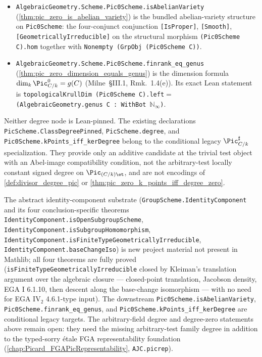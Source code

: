 \begin{itemize}
    \cref{thm:pic_is_group_scheme}.
  \item \texttt{AlgebraicGeometry.Scheme.Pic0Scheme.isAbelianVariety}
    (\cref{thm:pic_zero_is_abelian_variety}) is the bundled
    abelian-variety structure on \texttt{Pic0Scheme}: the four-conjunct
    conjunction \texttt{[IsProper]}, \texttt{[Smooth]},
    \texttt{[GeometricallyIrreducible]} on the structural morphism
    \texttt{(Pic0Scheme C).hom} together with
    \texttt{Nonempty (GrpObj (Pic0Scheme C))}.
  \item \texttt{AlgebraicGeometry.Scheme.Pic0Scheme.finrank\_eq\_genus}
    (\cref{thm:pic_zero_dimension_equals_genus}) is the dimension
    formula \(\dim_k \Pic^0_{C/k} = g(C)\) (Milne~\S III.1,
    Rmk.~1.4(e)). Its exact Lean statement is
    \texttt{topologicalKrullDim (Pic0Scheme C).left}\(={}\)
    \texttt{(AlgebraicGeometry.genus C : WithBot}\,
    \(\mathbb N_\infty\)\texttt{)}.
\end{itemize}

Neither degree node is Lean-pinned. The existing declarations
\texttt{PicScheme.ClassDegreePinned}, \texttt{PicScheme.degree}, and
\texttt{Pic0Scheme.kPoints\_iff\_kerDegree} belong to the conditional legacy
\(\Pic^\sharp_{C/k}\) specialization. They provide only an additive candidate
at the trivial test object with an Abel-image compatibility condition, not the
arbitrary-test locally constant signed degree on \(\Pic_{(C/k)\et}\), and are
not encodings of \cref{def:divisor_degree_pic} or
\cref{thm:pic_zero_k_points_iff_degree_zero}.

The abstract identity-component substrate
(\texttt{GroupScheme.IdentityComponent} and its four
conclusion-specific theorems
\texttt{IdentityComponent.isOpenSubgroupScheme},
\texttt{IdentityComponent.isSubgroupHomomorphism},
\texttt{IdentityComponent.isFiniteTypeGeometricallyIrreducible},
\texttt{IdentityComponent.baseChangeIso}) is new project material not
present in Mathlib; all four theorems are fully proved
(\texttt{isFiniteTypeGeometricallyIrreducible} closed by Kleiman's
translation argument over the algebraic closure --- closed-point
translation, Jacobson density, EGA I 6.1.10, then descent along the
base-change isomorphism --- with no need for EGA IV\(_2\) 4.6.1-type
input). The downstream
\texttt{Pic0Scheme.isAbelianVariety},
\texttt{Pic0Scheme.finrank\_eq\_genus}, and
\texttt{Pic0Scheme.kPoints\_iff\_kerDegree} are conditional legacy targets.
The arbitrary-field degree and degree-zero statements above remain open: they
need the missing arbitrary-test family degree in addition to the typed-sorry
\'etale FGA representability foundation
(\cref{chap:Picard_FGAPicRepresentability}, \texttt{AJC.picrep}).

